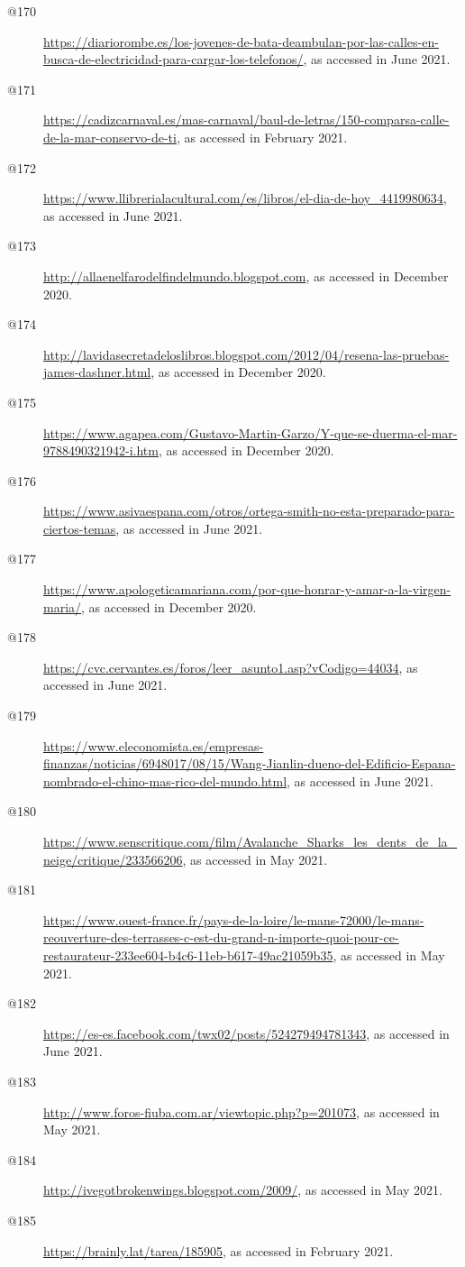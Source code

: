 \begin{flushleft}
\begin{description}
\item[@170]\url{https://diariorombe.es/los-jovenes-de-bata-deambulan-por-las-calles-en-busca-de-electricidad-para-cargar-los-telefonos/}, as accessed in June 2021.
\item[@171]\url{https://cadizcarnaval.es/mas-carnaval/baul-de-letras/150-comparsa-calle-de-la-mar-conservo-de-ti}, as accessed in February 2021.
\item[@172]\url{https://www.llibrerialacultural.com/es/libros/el-dia-de-hoy_4419980634}, as accessed in June 2021.
\item[@173]\url{http://allaenelfarodelfindelmundo.blogspot.com}, as accessed in December 2020.
\item[@174]\url{http://lavidasecretadeloslibros.blogspot.com/2012/04/resena-las-pruebas-james-dashner.html}, as accessed in December 2020.
\item[@175]\url{https://www.agapea.com/Gustavo-Martin-Garzo/Y-que-se-duerma-el-mar-9788490321942-i.htm}, as accessed in December 2020.
\item[@176]\url{https://www.asivaespana.com/otros/ortega-smith-no-esta-preparado-para-ciertos-temas}, as accessed in June 2021.
\item[@177]\url{https://www.apologeticamariana.com/por-que-honrar-y-amar-a-la-virgen-maria/}, as accessed in December 2020.
\item[@178]\url{https://cvc.cervantes.es/foros/leer_asunto1.asp?vCodigo=44034}, as accessed in June 2021.
\item[@179]\url{https://www.eleconomista.es/empresas-finanzas/noticias/6948017/08/15/Wang-Jianlin-dueno-del-Edificio-Espana-nombrado-el-chino-mas-rico-del-mundo.html}, as accessed in June 2021.
\item[@180]\url{https://www.senscritique.com/film/Avalanche_Sharks_les_dents_de_la_neige/critique/233566206}, as accessed in May 2021.
\item[@181]\url{https://www.ouest-france.fr/pays-de-la-loire/le-mans-72000/le-mans-reouverture-des-terrasses-c-est-du-grand-n-importe-quoi-pour-ce-restaurateur-233ee604-b4c6-11eb-b617-49ac21059b35}, as accessed in May 2021.
\item[@182]\url{https://es-es.facebook.com/twx02/posts/524279494781343}, as accessed in June 2021.
\item[@183]\url{http://www.foros-fiuba.com.ar/viewtopic.php?p=201073}, as accessed in May 2021.
\item[@184]\url{http://ivegotbrokenwings.blogspot.com/2009/}, as accessed in May 2021.
\item[@185]\url{https://brainly.lat/tarea/185905}, as accessed in February 2021.

\end{description}
\end{flushleft}
